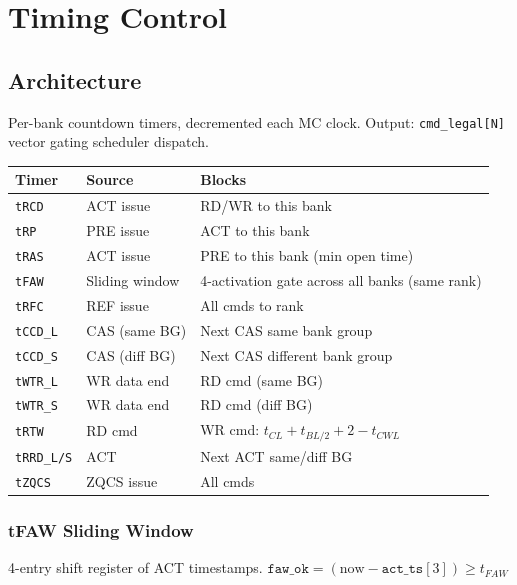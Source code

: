 \documentclass[11pt,a4paper]{article}
\begin{document}
\section{Timing Control}

\subsection*{Architecture}
Per-bank countdown timers, decremented each MC clock.
Output: \texttt{cmd\_legal[N]} vector gating scheduler dispatch.

\begin{center}
\begin{tabularx}{\linewidth}{@{} l l X @{}}
\toprule
\textbf{Timer} & \textbf{Source} & \textbf{Blocks} \\
\midrule
\texttt{tRCD} & ACT issue    & RD/WR to this bank \\
\texttt{tRP}  & PRE issue    & ACT to this bank \\
\texttt{tRAS} & ACT issue    & PRE to this bank (min open time) \\
\texttt{tFAW} & Sliding window & 4-activation gate across all banks (same rank) \\
\texttt{tRFC} & REF issue    & All cmds to rank \\
\texttt{tCCD\_L} & CAS (same BG) & Next CAS same bank group \\
\texttt{tCCD\_S} & CAS (diff BG) & Next CAS different bank group \\
\texttt{tWTR\_L} & WR data end  & RD cmd (same BG) \\
\texttt{tWTR\_S} & WR data end  & RD cmd (diff BG) \\
\texttt{tRTW}    & RD cmd       & WR cmd: $t_{CL} + t_{BL/2} + 2 - t_{CWL}$ \\
\texttt{tRRD\_L/S}& ACT         & Next ACT same/diff BG \\
\texttt{tZQCS}   & ZQCS issue   & All cmds \\
\bottomrule
\end{tabularx}
\end{center}

\subsubsection*{tFAW Sliding Window}
4-entry shift register of ACT timestamps.
$\texttt{faw\_ok} = (\text{now} - \texttt{act\_ts}[3]) \geq t_{FAW}$
\end{document}
